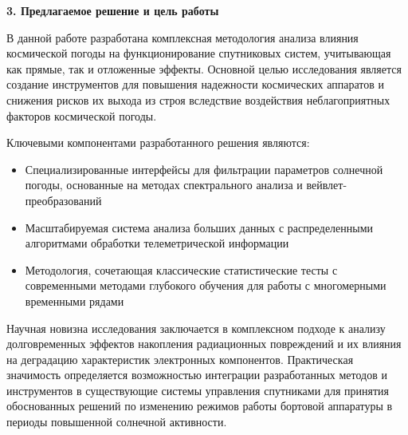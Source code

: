 \textbf{3. Предлагаемое решение и цель работы}

В данной работе разработана комплексная методология анализа влияния космической 
погоды на функционирование спутниковых систем, учитывающая как прямые, так и 
отложенные эффекты. Основной целью исследования является создание инструментов 
для повышения надежности космических аппаратов и снижения рисков их выхода из 
строя вследствие воздействия неблагоприятных факторов космической погоды.

Ключевыми компонентами разработанного решения являются:
\begin{itemize}
\item Специализированные интерфейсы для фильтрации параметров солнечной погоды, 
основанные на методах спектрального анализа и вейвлет-преобразований
\item Масштабируемая система анализа больших данных с распределенными алгоритмами 
обработки телеметрической информации
\item Методология, сочетающая классические статистические тесты с современными 
методами глубокого обучения для работы с многомерными временными рядами
\end{itemize}

Научная новизна исследования заключается в комплексном подходе к анализу 
долговременных эффектов накопления радиационных повреждений и их влияния на 
деградацию характеристик электронных компонентов. Практическая значимость 
определяется возможностью интеграции разработанных методов и инструментов в 
существующие системы управления спутниками для принятия обоснованных решений 
по изменению режимов работы бортовой аппаратуры в периоды повышенной солнечной 
активности.
